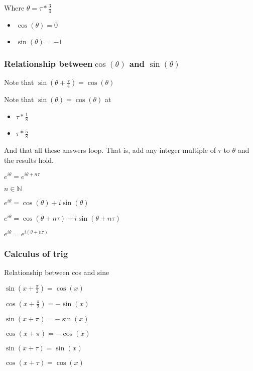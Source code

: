 Where \(\theta =\tau *\frac{3}{4}\)

\begin{itemize}
\item \(\cos (\theta )=0\)
\item \(\sin (\theta )=-1\)
\end{itemize}

\subsubsection{Relationship between\( \cos (\theta )\) and \(\sin(\theta )\)}

Note that \(\sin(\theta + \frac{\tau }{4})=\cos(\theta )\)

Note that \(\sin (\theta )=\cos (\theta )\) at

\begin{itemize}
\item $\tau *\frac{1}{8}$
\item $\tau *\frac{5}{8}$
\end{itemize}

And that all these answers loop. That is, add any integer multiple of \(\tau \) to \(\theta \) and the results hold.

$e^{i\theta } = e^{i\theta +n\tau }$

$n \in \mathbb{N}$

$e^{i\theta } = \cos(\theta )+i\sin(\theta )$

$e^{i\theta } = \cos(\theta +n\tau )+i\sin(\theta +n\tau ) $

$e^{i\theta } = e^{i(\theta +n\tau )}$


\subsubsection{Calculus of trig}

Relationship between cos and sine

$\sin(x+\frac{\pi }{2})=\cos(x)$

$\cos(x+\frac{\pi }{2})=-\sin(x)$

$\sin(x+\pi )=-\sin(x)$

$\cos(x+\pi )=-\cos(x)$

$\sin(x+\tau )=\sin(x)$

$\cos(x+\tau )=\cos(x)$


